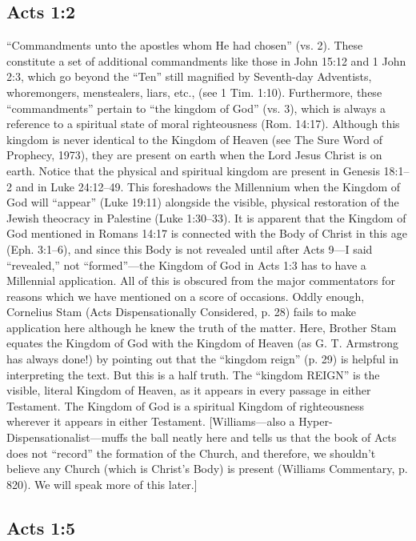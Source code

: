 \subsection{Acts 1:2}
“Commandments unto the apostles whom He had chosen” (vs. 2). These constitute a set of
additional commandments like those in John 15:12 and 1 John 2:3, which go beyond the “Ten” still
magnified by Seventh-day Adventists, whoremongers, menstealers, liars, etc., (see 1 Tim. 1:10).
Furthermore, these “commandments” pertain to “the kingdom of God” (vs. 3), which is always a
reference to a spiritual state of moral righteousness (Rom. 14:17). Although this kingdom is never
identical to the Kingdom of Heaven (see The Sure Word of Prophecy, 1973), they are present on earth
when the Lord Jesus Christ is on earth. Notice that the physical and spiritual kingdom are present in
Genesis 18:1–2 and in Luke 24:12–49. This foreshadows the Millennium when the Kingdom of God
will “appear” (Luke 19:11) alongside the visible, physical restoration of the Jewish theocracy in
Palestine (Luke 1:30–33). It is apparent that the Kingdom of God mentioned in Romans 14:17 is
connected with the Body of Christ in this age (Eph. 3:1–6), and since this Body is not revealed until after Acts 9—I said “revealed,” not “formed”—the Kingdom of God in Acts 1:3 has to have a
Millennial application.
All of this is obscured from the major commentators for reasons which we have mentioned on a
score of occasions. Oddly enough, Cornelius Stam (Acts Dispensationally Considered, p. 28) fails to
make application here although he knew the truth of the matter. Here, Brother Stam equates the
Kingdom of God with the Kingdom of Heaven (as G. T. Armstrong has always done!) by pointing out
that the “kingdom reign” (p. 29) is helpful in interpreting the text. But this is a half truth. The
“kingdom REIGN” is the visible, literal Kingdom of Heaven, as it appears in every passage in either
Testament. The Kingdom of God is a spiritual Kingdom of righteousness wherever it appears in either
Testament. [Williams—also a Hyper-Dispensationalist—muffs the ball neatly here and tells us that
the book of Acts does not “record” the formation of the Church, and therefore, we shouldn’t believe
any Church (which is Christ’s Body) is present (Williams Commentary, p. 820). We will speak more
of this later.]

\subsection{Acts 1:5}


